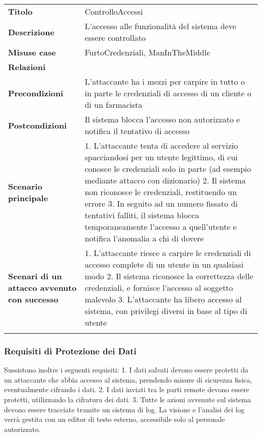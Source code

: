 \begin{longtable}[c]{@{}ll@{}}
\toprule\addlinespace
\textbf{Titolo} & ControlloAccessi
\\\addlinespace
\textbf{Descrizione} & L'accesso alle funzionalità del sistema deve
essere controllato
\\\addlinespace
\textbf{Misuse case} & FurtoCredenziali, ManInTheMiddle
\\\addlinespace
\textbf{Relazioni} &
\\\addlinespace
\textbf{Precondizioni} & L'attaccante ha i mezzi per carpire in tutto o
in parte le credenziali di accesso di un cliente o di un farmacista
\\\addlinespace
\textbf{Postcondizioni} & Il sistema blocca l'accesso non autorizzato e
notifica il tentativo di accesso
\\\addlinespace
\textbf{Scenario principale} & 1. L'attaccante tenta di accedere al
servizio spacciandosi per un utente legittimo, di cui conosce le
credenziali solo in parte (ad esempio mediante attacco con dizionario)
2. Il sistema non riconosce le credenziali, restituendo un errore 3. In
seguito ad un numero fissato di tentativi falliti, il sistema blocca
temporaneamente l'accesso a quell'utente e notifica l'anomalia a chi di
dovere
\\\addlinespace
\textbf{Scenari di un attacco avvenuto con successo} & 1. L'attaccante
riesce a carpire le credenziali di accesso complete di un utente in un
qualsiasi modo 2. Il sistema riconosce la correttezza delle credenziali,
e fornisce l'accesso al soggetto malevolo 3. L'attaccante ha libero
accesso al sistema, con privilegi diversi in base al tipo di utente
\\\addlinespace
\bottomrule
\end{longtable}

\subsubsection{Requisiti di Protezione dei
Dati}\label{requisiti-di-protezione-dei-dati}

Sussistono inoltre i seguenti requisiti: 1. I dati salvati devono essere
protetti da un attaccante che abbia accesso al sistema, prendendo misure
di sicurezza fisica, eventualmente cifrando i dati. 2. I dati inviati
tra le parti remote devono essere protetti, utilizzando la cifratura dei
dati. 3. Tutte le azioni avvenute sul sistema devono essere tracciate
tramite un sistema di log. La visione e l'analisi dei log verrà gestita
con un editor di testo esterno, accessibile solo al personale
autorizzato.

